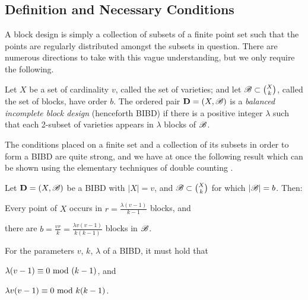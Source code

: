 \documentclass[../../../main]{subfiles}
\begin{document}
\subsection{Definition and Necessary Conditions}

A block design is simply a collection of subsets of a finite point set such
that the points are regularly distributed amongst the subsets in question.
There are numerous directions to take with this vague understanding, but we only
require the following.

 \begin{defin}\label{bibd}
 Let $X$ be a set of cardinality $v$, called the set of varieties; and let $\mathscr{B} \subset \binom{X}{k}$, called the set of blocks, have order $b$. The ordered pair $\mathbf{D}=(X,\mathscr{B})$ is a {\it balanced incomplete block design} (henceforth BIBD) if there is a positive integer $\lambda$ such that each 2-subset of varieties appears in $\lambda$ blocks of $\mathscr{B}$. \\
 \end{defin}

 The conditions placed on a finite set and a collection of its subsets in order
 to form a BIBD are quite strong, and we have at once the following result which
 can be shown using the elementary techniques of double counting
 \cite[see][Chapter 2 for
 an abstract discussion]{cameron-combinatorics}.

 \begin{prop}\label{prop-bibd-params}
   Let $\mathbf{D}=(X,\mathscr{B})$ be a BIBD with $|X| = v$, and $\mathscr{B} \subset \binom{X}{k}$ for which $|\mathscr{B}| = b$. Then:
   \begin{defenum}
   \item\label{replications} Every point of $X$ occurs in $r = \frac{\lambda(v-1)}{k-1}$ blocks, and 
   \item\label{blocks} there are $b = \frac{vr}{k} = \frac{\lambda v(v-1)}{k(k-1)}$ blocks in $\mathscr{B}$.
   \end{defenum}
 \end{prop}

 \begin{cor}\label{cor-bibd-params}
   For the parameters $v$, $k$, $\lambda$ of a BIBD, it must hold that 
   \begin{defenum}
   \item $\lambda(v-1) \equiv 0 \text{ mod } (k-1)$, and
   \item $\lambda v(v-1) \equiv 0 \text{ mod } k(k-1)$.
   \end{defenum}
 \end{cor}
\end{document}
